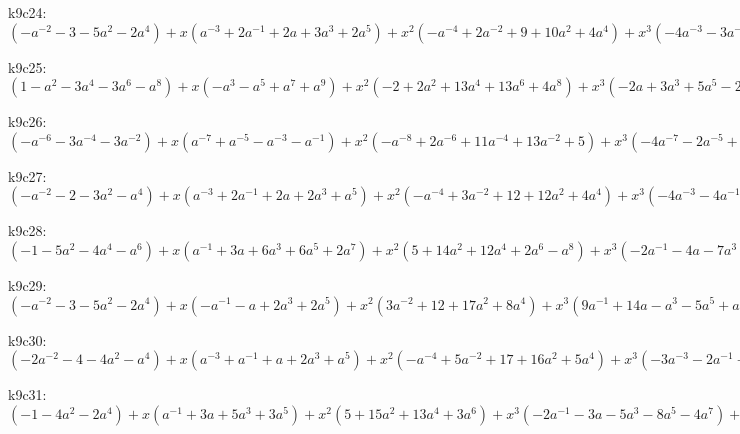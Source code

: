 k9c24: $ (-a^{-2}-3-5a^{2}-2a^{4}) +x(a^{-3}+2a^{-1}+2a+3a^{3}+2a^{5}) +x^{2}(-a^{-4}+2a^{-2}+9+10a^{2}+4a^{4}) +x^{3}(-4a^{-3}-3a^{-1}+a-3a^{3}-3a^{5}) +x^{4}(a^{-4}-5a^{-2}-11-10a^{2}-5a^{4}) +x^{5}(3a^{-3}-a^{-1}-7a-2a^{3}+a^{5}) +x^{6}(4a^{-2}+5+3a^{2}+2a^{4}) +x^{7}(3a^{-1}+5a+2a^{3}) +x^{8}(1+a^{2}) $

k9c25: $ (1-a^{2}-3a^{4}-3a^{6}-a^{8}) +x(-a^{3}-a^{5}+a^{7}+a^{9}) +x^{2}(-2+2a^{2}+13a^{4}+13a^{6}+4a^{8}) +x^{3}(-2a+3a^{3}+5a^{5}-2a^{7}-2a^{9}) +x^{4}(1-3a^{2}-15a^{4}-18a^{6}-7a^{8}) +x^{5}(2a-3a^{3}-10a^{5}-4a^{7}+a^{9}) +x^{6}(3a^{2}+6a^{4}+6a^{6}+3a^{8}) +x^{7}(3a^{3}+6a^{5}+3a^{7}) +x^{8}(a^{4}+a^{6}) $

k9c26: $ (-a^{-6}-3a^{-4}-3a^{-2}) +x(a^{-7}+a^{-5}-a^{-3}-a^{-1}) +x^{2}(-a^{-8}+2a^{-6}+11a^{-4}+13a^{-2}+5) +x^{3}(-4a^{-7}-2a^{-5}+7a^{-3}+3a^{-1}-2a) +x^{4}(a^{-8}-5a^{-6}-14a^{-4}-16a^{-2}-8) +x^{5}(3a^{-7}-a^{-5}-11a^{-3}-6a^{-1}+a) +x^{6}(4a^{-6}+6a^{-4}+5a^{-2}+3) +x^{7}(3a^{-5}+6a^{-3}+3a^{-1}) +x^{8}(a^{-4}+a^{-2}) $

k9c27: $ (-a^{-2}-2-3a^{2}-a^{4}) +x(a^{-3}+2a^{-1}+2a+2a^{3}+a^{5}) +x^{2}(-a^{-4}+3a^{-2}+12+12a^{2}+4a^{4}) +x^{3}(-4a^{-3}-4a^{-1}-2a^{3}-2a^{5}) +x^{4}(a^{-4}-5a^{-2}-16-17a^{2}-7a^{4}) +x^{5}(3a^{-3}-8a-4a^{3}+a^{5}) +x^{6}(4a^{-2}+7+6a^{2}+3a^{4}) +x^{7}(3a^{-1}+6a+3a^{3}) +x^{8}(1+a^{2}) $

k9c28: $ (-1-5a^{2}-4a^{4}-a^{6}) +x(a^{-1}+3a+6a^{3}+6a^{5}+2a^{7}) +x^{2}(5+14a^{2}+12a^{4}+2a^{6}-a^{8}) +x^{3}(-2a^{-1}-4a-7a^{3}-9a^{5}-4a^{7}) +x^{4}(-7-19a^{2}-17a^{4}-4a^{6}+a^{8}) +x^{5}(a^{-1}-3a-5a^{3}+2a^{5}+3a^{7}) +x^{6}(3+7a^{2}+8a^{4}+4a^{6}) +x^{7}(3a+6a^{3}+3a^{5}) +x^{8}(a^{2}+a^{4}) $

k9c29: $ (-a^{-2}-3-5a^{2}-2a^{4}) +x(-a^{-1}-a+2a^{3}+2a^{5}) +x^{2}(3a^{-2}+12+17a^{2}+8a^{4}) +x^{3}(9a^{-1}+14a-a^{3}-5a^{5}+a^{7}) +x^{4}(-3a^{-2}-11-24a^{2}-13a^{4}+3a^{6}) +x^{5}(-10a^{-1}-24a-8a^{3}+6a^{5}) +x^{6}(a^{-2}-1+6a^{2}+8a^{4}) +x^{7}(3a^{-1}+9a+6a^{3}) +x^{8}(2+2a^{2}) $

k9c30: $ (-2a^{-2}-4-4a^{2}-a^{4}) +x(a^{-3}+a^{-1}+a+2a^{3}+a^{5}) +x^{2}(-a^{-4}+5a^{-2}+17+16a^{2}+5a^{4}) +x^{3}(-3a^{-3}-2a^{-1}-3a^{3}-2a^{5}) +x^{4}(a^{-4}-7a^{-2}-23-22a^{2}-7a^{4}) +x^{5}(3a^{-3}-2a^{-1}-9a-3a^{3}+a^{5}) +x^{6}(5a^{-2}+10+8a^{2}+3a^{4}) +x^{7}(4a^{-1}+7a+3a^{3}) +x^{8}(1+a^{2}) $

k9c31: $ (-1-4a^{2}-2a^{4}) +x(a^{-1}+3a+5a^{3}+3a^{5}) +x^{2}(5+15a^{2}+13a^{4}+3a^{6}) +x^{3}(-2a^{-1}-3a-5a^{3}-8a^{5}-4a^{7}) +x^{4}(-7-21a^{2}-23a^{4}-8a^{6}+a^{8}) +x^{5}(a^{-1}-3a-7a^{3}+a^{5}+4a^{7}) +x^{6}(3+8a^{2}+11a^{4}+6a^{6}) +x^{7}(3a+7a^{3}+4a^{5}) +x^{8}(a^{2}+a^{4}) $

